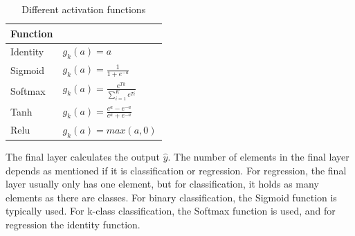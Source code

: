         
        
    \begin{table}[h]
        \centering
        \begin{tabular}{l l}
            \toprule
            \textbf{Function} & \\ \midrule
            Identity & $g_k(a) =a$ \\ 
            Sigmoid & $g_k(a) =\frac{1}{1+e^{-a}}$ \\ 
            Softmax & $g_k(a) =\frac{e^{Tk}}{\sum_{i=1}^Ke^{Ti}}$ \\ 
            Tanh & $g_k(a) =\frac{e^a-e^{-a}}{e^a+e^{-a}}$ \\ 
            Relu & $g_k(a) =max(a,0)$ \\ \bottomrule
        \end{tabular}
        \caption{Different activation functions}
        \label{tab:acitvations}
    \end{table}
        The final layer calculates the output $\hat y$. The number of elements in the final layer depends as mentioned if it is classification or regression. For regression, the final layer usually only has one element, but for classification, it holds as many elements as there are classes. For binary classification, the Sigmoid function is typically used. For k-class classification, the Softmax function is used, and for regression the identity function.
        

